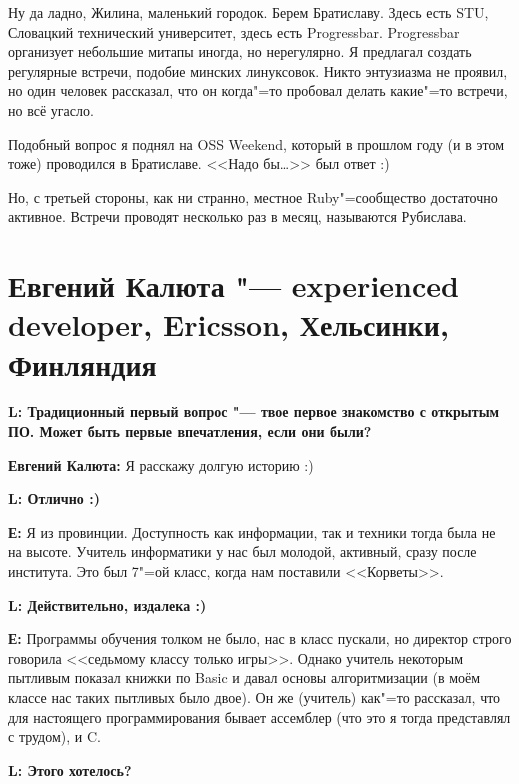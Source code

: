 \documentclass[10pt, a5paper]{article}
\begin{document}
Ну да ладно, Жилина, маленький городок. Берем Братиславу. Здесь есть STU, Словацкий технический университет, здесь есть Progressbar.  Progressbar организует небольшие митапы иногда, но нерегулярно. Я предлагал создать регулярные встречи, подобие минских линуксовок. Никто энтузиазма не проявил, но один человек рассказал, что он когда"=то пробовал делать какие"=то встречи, но всё угасло.

Подобный вопрос я поднял на OSS Weekend, который в прошлом году (и в этом тоже) проводился в Братиславе. <<Надо бы\ldots>> был ответ :)

Но, с третьей стороны, как ни странно, местное Ruby"=сообщество достаточно активное. Встречи проводят несколько раз в месяц, называются Рубислава.


\section[Евгений Калюта "--- experienced developer, Ericsson, Хельсинки, Финляндия]{Евгений Калюта "--- experienced develo\-per, Ericsson, Хельсинки, Финляндия}


{\noindent \bf L: Традиционный первый вопрос "--- твое первое знакомство с открытым ПО. Может быть первые впечатления, если они были?}

{\noindent \bf Евгений Калюта:} Я расскажу долгую историю :) 

{\noindent \bf L: Отлично :)}

{\noindent \bf Е:} Я из провинции. Доступность как информации, так и техники тогда была не на высоте. Учитель информатики у нас был молодой, активный, сразу после
института. Это был 7"=ой класс, когда нам поставили <<Корветы>>. 

{\noindent \bf L: Действительно, издалека :)}


{\noindent \bf Е:} Программы обучения толком не было, нас в класс пускали, но директор строго говорила
<<седьмому классу только игры>>. Однако учитель некоторым пытливым показал книжки по Basic и давал основы алгоритмизации (в моём классе нас таких пытливых было двое). Он же (учитель) как"=то рассказал, что для настоящего
программирования бывает ассемблер (что это я тогда представлял с трудом), и C.

{\noindent \bf L: Этого хотелось?}
\end{document}
